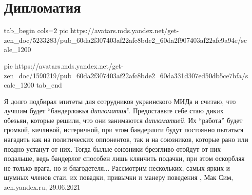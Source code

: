  
 
 
 
 
\chapter{Дипломатия}
\label{sec:slova.diplomatia}

\ifcmt

\ifcmt
  tab_begin cols=2
    pic https://avatars.mds.yandex.net/get-zen_doc/5233283/pub_60da2f307403af22afc8bde2_60da2f907403af22afc9a94e/scale_1200

    pic https://avatars.mds.yandex.net/get-zen_doc/1590219/pub_60da2f307403af22afc8bde2_60da331d307ed50db5ce7bfa/scale_1200
  tab_end
\fi

\fi
Я долго подбирал эпитеты для сотрудников украинского МИДа и считаю, что лучшим
будет \enquote{бандерложья \emph{дипломатия}}.  Предоставьте себе стаю диких обезьян, которые
решили, что они занимаются \emph{дипломатией}. Их \enquote{работа} будет громкой, кичливой,
истеричной, при этом бандерлоги будут постоянно пытаться нагадить как на
политических оппонентов, так и на союзников, которые рано или поздно устанут от
них. Тогда былые союзники брезгливо отойдут от них подальше, ведь бандерлог
способен лишь клянчить подачки, при этом оскорбляя не только врага, но и
благодетеля...  Рассмотрим нескольких, самых ярких и шумных членов стаи, их
повадки, привычки и манеру поведения
, 
Мак Сим, zen.yandex.ru, 29.06.2021
